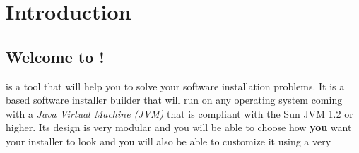 \chapter*{Introduction}

\section*{Welcome to \IzPack !}

\IzPack is a tool that will help you to solve your software installation
problems. It is a \Java based software installer builder that will run
on any operating system coming with a \textit{Java Virtual Machine
(JVM)} that is compliant with the Sun JVM 1.2 or higher. Its design is
very modular and you will be able to choose how \textbf{you} want your
installer to look and you will also be able to customize it using a very
